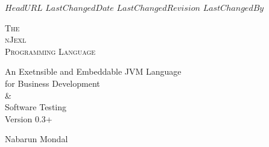 \svnidlong
{$HeadURL$}
{$LastChangedDate$}
{$LastChangedRevision$}
{$LastChangedBy$}

\thispagestyle{titlepage}

\begin{center}
  \newlength{\parSepLength}
  \setlength{\parSepLength}{10ex}

  \Large
  \centering

  \thinRule\par
  \par\vspace{0.15\parSepLength}
  \begin{minipage}{\textwidth}
    \centering
    \fontsize{36pt}{20pt}\selectfont\titleColor\scshape
    The \\ nJexl \\ Programming Language  
  \end{minipage}
  \par\vspace{0.25\parSepLength}
  \par\thinRule

  \vspace{0.125\parSepLength}

  \begin{minipage}{\textwidth}
    \centering
    An Exetnsible and Embeddable JVM Language \\ for Business Development \\ \& \\ Software Testing \\
    Version 0.3+
  \end{minipage}

  \vfill

  \begin{minipage}{\textwidth}
    \centering
    \Large
    Nabarun Mondal
  \end{minipage}

  \vfill

  \begin{minipage}{0.8\textwidth}
    \centering
    \small
  \end{minipage}
\end{center}
